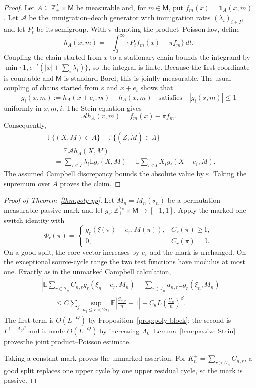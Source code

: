 \documentclass[11pt]{article}
\theoremstyle{remark}
\newcommand{\Pp}{\mathbb P}
\newcommand{\Ee}{\mathbb E}
\newcommand{\one}{\mathbf 1}
\newcommand{\dd}{\,d}
\begin{document}
\begin{proof}
Let $A\subseteq\mathbb Z_+^I\times\mathsf M$ be measurable and, for
$m\in\mathsf M$, put $f_m(x)=\one_A(x,m)$.  Let $\mathcal A$ be the
immigration--death generator with immigration rates $(\lambda_i)_{i\in I}$,
and let $P_t$ be its semigroup.  With $\pi$ denoting the product--Poisson
law, define
\[
 h_A(x,m)=-\int_0^\infty\{P_tf_m(x)-\pi f_m\}\dd t.
\]
Coupling the chain started from $x$ to a stationary chain bounds the
integrand by
$\min\{1,e^{-t}(|x|+\sum_i\lambda_i)\}$, so the integral is finite.
Because the first coordinate is countable and $\mathsf M$ is standard
Borel, this is jointly measurable.  The usual coupling of chains started
from $x$ and $x+e_i$ shows that
\[
 g_i(x,m):=h_A(x+e_i,m)-h_A(x,m)
 \quad\text{satisfies}\quad |g_i(x,m)|\le1
\]
uniformly in $x,m,i$.  The Stein equation gives
\[
 \mathcal A h_A(x,m)=f_m(x)-\pi f_m.
\]
Consequently,
\begin{align*}
 &\Pp\{(X,M)\in A\}
 -\Pp\{(Z,\widetilde M)\in A\}\\
 &\quad=\Ee\mathcal A h_A(X,M)\\
 &\quad=\sum_{i\in I}\lambda_i\Ee g_i(X,M)
 -\Ee\sum_{i\in I}X_i g_i(X-e_i,M).
\end{align*}
The assumed Campbell discrepancy bounds the absolute value by
$\varepsilon$.  Taking the supremum over $A$ proves the claim.
\end{proof}

\begin{proof}[Proof of Theorem~\ref{thm:poly-pp}]
Let $M_n=M_n(\sigma_n)$ be a permutation-measurable passive mark and let
$g_r:\mathbb Z_+^{\mathcal I_n}\times\mathsf M\to[-1,1]$.  Apply the marked
one-switch identity with
\[
 \Phi_r(\pi)=
 \begin{cases}
 g_r(\xi(\pi)-e_r,M(\pi)),&C_r(\pi)\ge1,\\
 0,&C_r(\pi)=0.
 \end{cases}
\]
On a good split, the core vector increases by $e_r$ and the mark is
unchanged.  On the exceptional source-cycle range the two test functions
have modulus at most one.  Exactly as in the unmarked Campbell calculation,
\begin{align*}
 &\left|
 \Ee\sum_{r\in\mathcal I_n}C_{n,r}g_r(\xi_n-e_r,M_n)
 -\sum_{r\in\mathcal I_n}a_{n,r}\Ee g_r(\xi_n,M_n)
 \right|\\
 &\qquad\le
 C\sum_j\sup_{a_j\le r<2a_j}
 \Ee\left|\frac{S_{n,r}}n-1\right|
 +C_\kappa L\left(\frac{U_n}{n}\right)^\beta.
\end{align*}
The first term is $O(L^{-Q})$ by
Proposition~\ref{prop:poly-block}; the second is $L^{1-A_0\beta}$ and is
made $O(L^{-Q})$ by increasing $A_0$.  Lemma~\ref{lem:passive-Stein} provesthe joint product--Poisson estimate.

Taking a constant mark proves the unmarked assertion.  For
$K_n^+=\sum_{r>U_n}C_{n,r}$, a good split replaces one upper cycle by one
upper residual cycle, so the mark is passive.
\end{proof}
\end{document}
